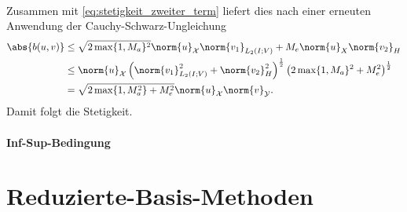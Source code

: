 \begin{Satz}
\begin{Beweis}
\begin{align}
        \end{align}
        Zusammen mit \eqref{eq:stetigkeit_zweiter_term} liefert dies nach einer erneuten Anwendung der Cauchy-Schwarz-Ungleichung
        \begin{align}
        \abs{b(u, v)} 
        &\leq \sqrt{2 \max\{1, M_{a}\}^{2}} \norm{u}_{\mathcal X} \norm{v_{1}}_{L_{2}(I; V)} + M_{e} \norm{u}_{X} \norm{v_{2}}_{H}
        \\
        &\leq \norm{u}_{\mathcal X} \left( \norm{v_{1}}_{L_{2}(I; V)}^{2} + \norm{v_{2}}_{H}^{2} \right)^{\frac 12} \left( 2 \max\{1, M_{a}\}^{2} + M_{e}^{2} \right)^{\frac 12}
        \\
        &= \sqrt{2 \max\{1, M_{a}^{2}\} + M_{e}^{2}} \norm{u}_{\mathcal X} \norm{v}_{\mathcal Y}.
        \end{align}
        Damit folgt die Stetigkeit.

        \paragraph{Inf-Sup-Bedingung} %
        \label{par:inf_sup_bedingung}

    \end{Beweis}
\end{Satz}



\section{Reduzierte-Basis-Methoden} %
\label{sec:reduzierte_basis_methoden}


